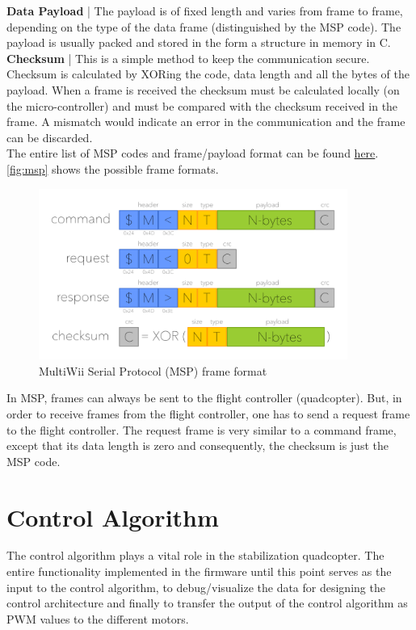 \documentclass[a4paper,12pt,oneside]{book}
\begin{document}
\textbf{Data Payload} | The payload is of fixed length and varies from frame to frame, depending on the type of the data frame (distinguished by the MSP code). The payload is usually packed and stored in the form a structure in memory in C.\\

\textbf{Checksum} | This is a simple method to keep the communication secure. Checksum is calculated by XORing the code, data length and all the bytes of the payload. When a frame is received the checksum must be calculated locally (on the micro-controller) and must be compared with the checksum received in the frame. A mismatch would indicate an error in the communication and the frame can be discarded.\\

The entire list of MSP codes and frame/payload format can be found \href{http://www.multiwii.com/wiki/index.php?title=Multiwii_Serial_Protocol}{here}. \autoref{fig:msp} shows the possible frame formats.\\

\begin{figure}[!htb]
\centering
\includegraphics[width=0.9\textwidth]{images/msp_frame}
\caption{MultiWii Serial Protocol (MSP) frame format}
\label{fig:msp}
\end{figure}

In MSP, frames can always be sent to the flight controller (quadcopter). But, in order to receive frames from the flight controller, one has to send a request frame to the flight controller. The request frame is very similar to a command frame, except that its data length is zero and consequently, the checksum is just the MSP code.\\

\section{Control Algorithm}
The control algorithm plays a vital role in the stabilization quadcopter. The entire functionality implemented in the firmware until this point serves as the input to the control algorithm, to debug/visualize the data for designing the control architecture and finally to transfer the output of the control algorithm as PWM values to the different motors.\\
\end{document}
